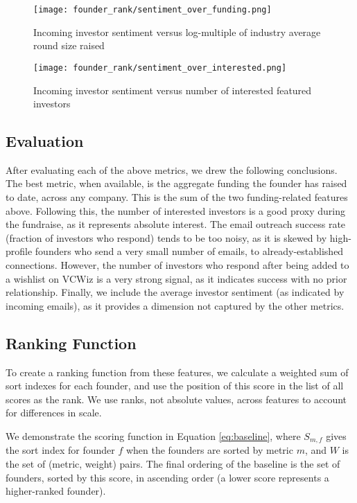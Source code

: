 \begin{figure}[ht]
  \centering
  \begin{minipage}[t]{0.48\textwidth}
    \centering
    \texttt{[image: founder\_rank/sentiment\_over\_funding.png]}
    \caption{Incoming investor sentiment versus log-multiple of industry average round size raised}
    \label{fig:sentiment:raised}
  \end{minipage}\hfill
  \begin{minipage}[t]{0.48\textwidth}
    \centering
    \texttt{[image: founder\_rank/sentiment\_over\_interested.png]}
    \caption{Incoming investor sentiment versus number of interested featured investors}
    \label{fig:sentiment:interested}
  \end{minipage}
\end{figure}

\subsection{Evaluation}

After evaluating each of the above metrics, we drew the following conclusions. The best metric, when available, is the aggregate funding the founder has raised to date, across any company. This is the sum of the two funding-related features above. Following this, the number of interested investors is a good proxy during the fundraise, as it represents absolute interest. The email outreach success rate (fraction of investors who respond) tends to be too noisy, as it is skewed by high-profile founders who send a very small number of emails, to already-established connections. However, the number of investors who respond after being added to a wishlist on VCWiz is a very strong signal, as it indicates success with no prior relationship. Finally, we include the average investor sentiment (as indicated by incoming emails), as it provides a dimension not captured by the other metrics.

\subsection{Ranking Function}

To create a ranking function from these features, we calculate a weighted sum of sort indexes for each founder, and use the position of this score in the list of all scores as the rank. We use ranks, not absolute values, across features to account for differences in scale.

We demonstrate the scoring function in Equation \ref{eq:baseline}, where $S_{m, f}$ gives the sort index for founder $f$ when the founders are sorted by metric $m$, and $W$ is the set of (metric, weight) pairs. The final ordering of the baseline is the set of founders, sorted by this score, in ascending order (a lower score represents a higher-ranked founder).

